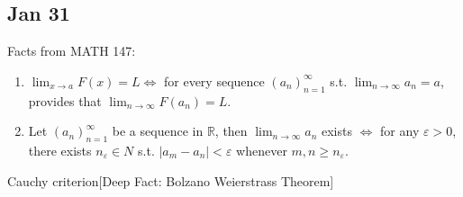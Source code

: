 \documentclass[12pt]{article}
\theoremstyle{plain}
\newcommand{\abs}[1]{\left| #1 \right|}
\newcommand{\mR}{{\mathbb{R}}}
\newcommand{\ep}{\varepsilon}
\begin{document}
\newpage
\subsection{Jan 31}
Facts from MATH 147: 
\begin{enumerate}
	\item $\lim_{x\to a} F(x) = L \Leftrightarrow$ for every sequence 
		$(a_n)^{\infty}_{n=1}$ s.t. $\lim_{n\to\infty} a_n=a$, provides 
		that $\lim_{n\to\infty} F(a_n) = L$. 
	\item Let $(a_n)_{n=1}^{\infty}$ be a sequence in $\mR$, then 
		$\lim_{n\to\infty} a_n$ exists $\Leftrightarrow$ for any $\ep>0$, 
		there exists $n_\ep \in N$ s.t. 
		$\abs{a_m-a_n} <\ep$ whenever $m,n \geq n_{\ep}$. \\
\end{enumerate}

Cauchy criterion[Deep Fact: Bolzano Weierstrass Theorem]\\
\end{document}
